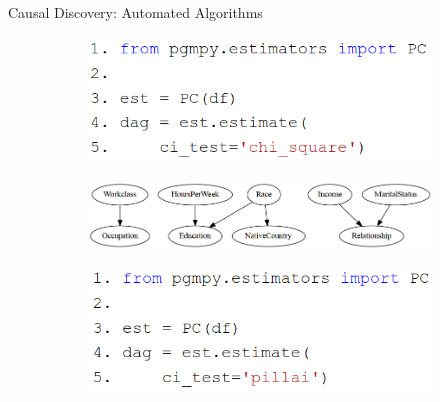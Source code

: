 \documentclass{beamer}
\begin{document}
% 
% 

\begin{frame}{Causal Discovery: Automated Algorithms}
	\begin{figure}
		\begin{subfigure}{0.45\textwidth}
			\centering
			\includegraphics[scale=0.28]{imgs/pc_chisquare.png}
		\end{subfigure}%
		\begin{subfigure}{0.55 \textwidth}
			\centering
			\includegraphics[scale=0.25]{imgs/adult_x2.png}
		\end{subfigure}\vfill
		\begin{subfigure}{0.45 \textwidth}
			\centering
			\includegraphics[scale=0.28]{imgs/pc_pillai.png}
		\end{subfigure}%

\end{figure}
\end{frame}
\end{document}
